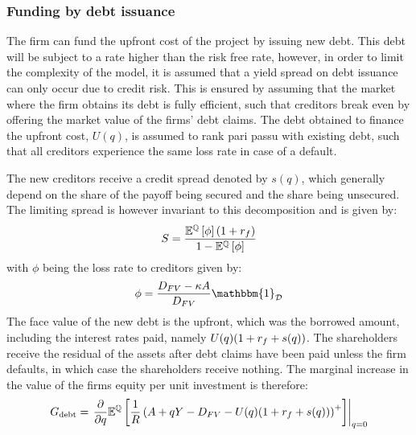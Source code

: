 \documentclass[../main.tex]{subfiles}
\begin{document}
    \subsubsection{Funding by debt issuance}
        The firm can fund the upfront cost of the project by issuing new debt.
        This debt will be subject to a rate higher than the risk free rate, 
        however, in order to limit the complexity of the model, 
        it is assumed that a yield spread on debt issuance can only occur due to credit risk. 
        This is ensured by assuming that the market where the firm obtains its debt is fully efficient, 
        such that creditors break even by offering the market value of the firms' debt claims.
        The debt obtained to finance the upfront cost, $U(q)$, is assumed to rank pari passu with existing debt, 
        such that all creditors experience the same loss rate in case of a default.

        The new creditors receive a credit spread denoted by $s(q)$,
        which generally depend on the share of the payoff being secured and the share being unsecured.
        The limiting spread is however invariant to this decomposition and is given by:
            \begin{equation}
                S = \frac{
                    \mathbb{E}^{\mathbb{Q}}\left[\phi\right] 
                    (1 + r_{f})
                }{
                    1 - \mathbb{E}^{\mathbb{Q}}\left[\phi\right]
                }
            \end{equation}
        with $\phi$ being the loss rate to creditors given by:
            \begin{equation}
                \phi = \frac{
                        D_{FV} - \kappa A
                    }{
                        D_{FV}
                    } 
                \mathbbm{1}_{\mathcal{D}}
            \end{equation}
        The face value of the new debt is the upfront, which was the borrowed amount, 
        including the interest rates paid, namely 
        $U(q)(1 + r_{f} + s(q))$. 
        The shareholders receive the residual of the assets after debt claims have been paid
        unless the firm defaults, in which case the shareholders receive nothing. 
        The marginal increase in the value of the firms equity per unit investment is therefore:
            \begin{equation}
                G_{\text{debt}} = 
                \left.
                \frac{
                    \partial 
                }{
                    \partial 
                    q
                }
                \mathbb{E}^{\mathbb{Q}}\left[
                    \frac{1}{R} 
                    \left(
                        A + qY - D_{FV} - U(q)(1 + r_{f} + s(q))
                    \right)^{+}
                \right] 
                \right\rvert_{q=0} 
            \end{equation}
        
\end{document}
